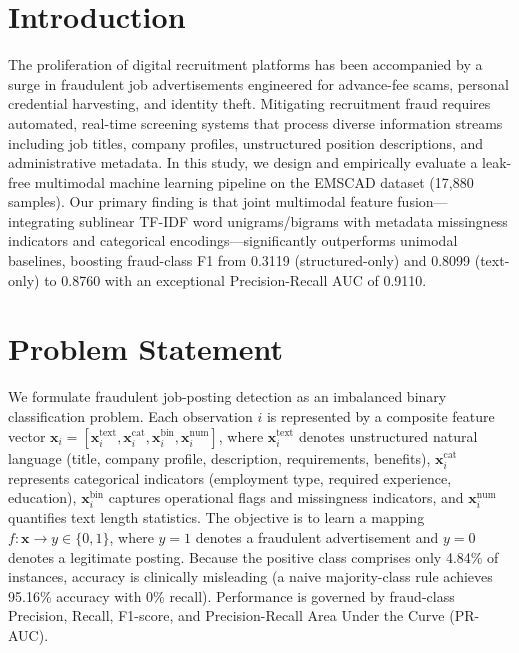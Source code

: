 \documentclass[conference]{IEEEtran}
\begin{document}
\section{Introduction}
The proliferation of digital recruitment platforms has been accompanied by a surge in fraudulent job advertisements engineered for advance-fee scams, personal credential harvesting, and identity theft. Mitigating recruitment fraud requires automated, real-time screening systems that process diverse information streams including job titles, company profiles, unstructured position descriptions, and administrative metadata. In this study, we design and empirically evaluate a leak-free multimodal machine learning pipeline on the EMSCAD dataset (17,880 samples). Our primary finding is that joint multimodal feature fusion—integrating sublinear TF-IDF word unigrams/bigrams with metadata missingness indicators and categorical encodings—significantly outperforms unimodal baselines, boosting fraud-class F1 from 0.3119 (structured-only) and 0.8099 (text-only) to 0.8760 with an exceptional Precision-Recall AUC of 0.9110.

\section{Problem Statement}
We formulate fraudulent job-posting detection as an imbalanced binary classification problem. Each observation $i$ is represented by a composite feature vector $\mathbf{x}_i = [\mathbf{x}_i^{\text{text}}, \mathbf{x}_i^{\text{cat}}, \mathbf{x}_i^{\text{bin}}, \mathbf{x}_i^{\text{num}}]$, where $\mathbf{x}_i^{\text{text}}$ denotes unstructured natural language (title, company profile, description, requirements, benefits), $\mathbf{x}_i^{\text{cat}}$ represents categorical indicators (employment type, required experience, education), $\mathbf{x}_i^{\text{bin}}$ captures operational flags and missingness indicators, and $\mathbf{x}_i^{\text{num}}$ quantifies text length statistics. The objective is to learn a mapping $f: \mathbf{x} \to y \in \{0, 1\}$, where $y=1$ denotes a fraudulent advertisement and $y=0$ denotes a legitimate posting. Because the positive class comprises only 4.84\% of instances, accuracy is clinically misleading (a naive majority-class rule achieves 95.16\% accuracy with 0\% recall). Performance is governed by fraud-class Precision, Recall, F1-score, and Precision-Recall Area Under the Curve (PR-AUC).
\end{document}
